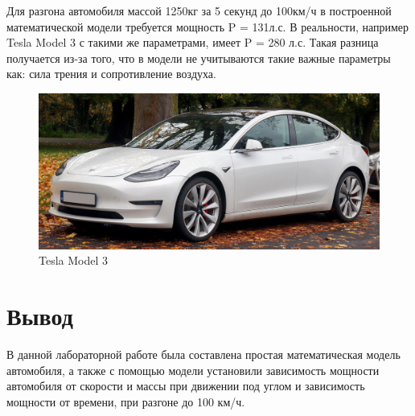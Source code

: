 \documentclass[a4paper, 14pt]{extarticle}
\begin{document}
			Для разгона автомобиля массой 1250кг за 5 секунд до 100км/ч в 
			построенной математической модели требуется мощность P = 131л.с.
			В реальности, например Tesla Model 3 с такими же параметрами, имеет P = 280 л.с.
			Такая разница получается из-за того, что в модели не учитываются такие важные параметры
			как: сила трения и сопротивление воздуха.
			\begin{figure}[H]
				\centering
				\includegraphics[width = \linewidth]{fig4.png}
				\caption[.] {Tesla Model 3}
			\end{figure}
		\section{Вывод}
			В данной лабораторной работе была составлена простая математическая модель автомобиля,
			а также с помощью модели установили зависимость мощности автомобиля от скорости и массы
			при движении под углом и зависимость мощности от времени, при разгоне до 100 км/ч.
\end{document}
